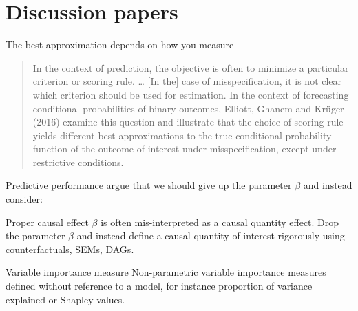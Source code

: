 \documentclass[smaller]{beamer}\usepackage{listings}
\begin{document}
\section{Discussion papers}
\label{sec:org575171f}
\begin{frame}[label={sec:orgf088758}]{The best approximation depends on how you measure}
\begin{quote} %
In the context of prediction, the objective is often to minimize a particular criterion or scoring
rule. \ldots{} [In the] case of misspecification, it is not clear which criterion should be used for
estimation. In the context of forecasting conditional probabilities of binary outcomes, Elliott,
Ghanem and Krüger (2016) examine this question and illustrate that \alert{the choice of scoring rule
yields different best approximations to the true conditional probability function of the outcome of
interest under misspecification}, except under restrictive conditions. \citep{ghanem2019discussion}
\end{quote}
\end{frame}

\begin{frame}[label={sec:orge378b0d}]{Predictive performance}
\cite{rinaldo2019comment} argue that we should give up the parameter \(\beta\) and instead consider:

\begin{block}{Proper causal effect}
\(\beta\) is often mis-interpreted as a causal quantity effect. Drop the parameter \(\beta\) and instead
define a causal quantity of interest rigorously using counterfactuals, SEMs, DAGs.
\end{block}

\begin{block}{Variable importance measure}
Non-parametric variable importance measures defined without reference to a model, for instance
proportion of variance explained or Shapley values.
\end{block}
\end{frame}
\end{document}
